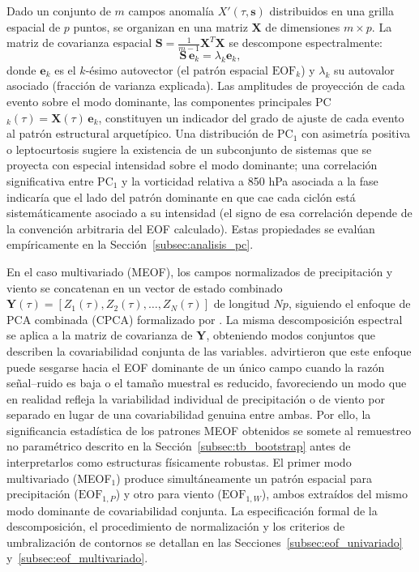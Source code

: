 Dado un conjunto de $m$ campos anomalía $X'(\tau, \mathbf{s})$ distribuidos en una grilla espacial de $p$ puntos, se organizan en una matriz $\mathbf{X}$ de dimensiones $m \times p$. La matriz de covarianza espacial $\mathbf{S} = \frac{1}{m-1}\mathbf{X}^T\mathbf{X}$ se descompone espectralmente:
\begin{equation}\label{eq:eof_decomp}
\mathbf{S}\,\mathbf{e}_k = \lambda_k \mathbf{e}_k,
\end{equation}
donde $\mathbf{e}_k$ es el $k$-ésimo autovector (el patrón espacial $\text{EOF}_k$) y $\lambda_k$ su autovalor asociado (fracción de varianza explicada).
Las amplitudes de proyección de cada evento sobre el modo dominante, las componentes principales PC$_k(\tau) = \mathbf{X}(\tau)\,\mathbf{e}_k$, constituyen un indicador del grado de ajuste de cada evento al patrón estructural arquetípico.
Una distribución de PC$_1$ con asimetría positiva o leptocurtosis sugiere la existencia de un subconjunto de sistemas que se proyecta con especial intensidad sobre el modo dominante; una correlación significativa entre PC$_1$ y la vorticidad relativa a 850 hPa asociada a la fase indicaría que el lado del patrón dominante en que cae cada ciclón está sistemáticamente asociado a su intensidad (el signo de esa correlación depende de la convención arbitraria del EOF calculado).
Estas propiedades se evalúan empíricamente en la Sección~\ref{subsec:analisis_pc}.

En el caso multivariado (MEOF), los campos normalizados de precipitación y viento se concatenan en un vector de estado combinado $\mathbf{Y}(\tau) = [Z_1(\tau), Z_2(\tau), \dots, Z_N(\tau)]$ de longitud $Np$, siguiendo el enfoque de PCA combinada (CPCA) formalizado por \citet{bretherton1992intercomparison}.
La misma descomposición espectral se aplica a la matriz de covarianza de $\mathbf{Y}$, obteniendo modos conjuntos que describen la covariabilidad conjunta de las variables.
\citet{bretherton1992intercomparison} advirtieron que este enfoque puede sesgarse hacia el EOF dominante de un único campo cuando la razón señal--ruido es baja o el tamaño muestral es reducido, favoreciendo un modo que en realidad refleja la variabilidad individual de precipitación o de viento por separado en lugar de una covariabilidad genuina entre ambas. 
Por ello, la significancia estadística de los patrones MEOF obtenidos se somete al remuestreo no paramétrico descrito en la Sección~\ref{subsec:tb_bootstrap} antes de interpretarlos como estructuras físicamente robustas.
El primer modo multivariado (MEOF$_1$) produce simultáneamente un patrón espacial para precipitación ($\text{EOF}_{1,P}$) y otro para viento ($\text{EOF}_{1,W}$), ambos extraídos del mismo modo dominante de covariabilidad conjunta.
La especificación formal de la descomposición, el procedimiento de normalización y los criterios de umbralización de contornos se detallan en las Secciones~\ref{subsec:eof_univariado} y~\ref{subsec:eof_multivariado}.

